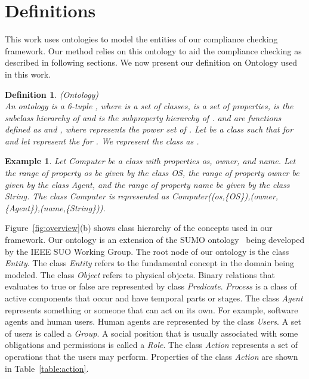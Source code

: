 \documentclass[12pt,journal,letterpaper,onecolumn]{IEEEtran}
\newtheorem{definition}{Definition}[section]
\newtheorem{example}{Example}[section]
\begin{document}
\section{Definitions}
\label{sec:definitions} This work uses ontologies to model the
entities of our compliance checking framework. Our method relies on this
ontology to aid the compliance checking as described in following
sections.  We now present our definition on Ontology used in
this work.



\begin{definition}(Ontology)\\
An ontology  is a 6-tuple
,
where  is a set of classes,  is a set of
properties,  is the subclass hierarchy of
 and  is the subproperty hierarchy of
.  and  are functions defined as
 and
, where
 represents the power set of .
Let  be a class such that  for
 and let  represent the  for
. We represent the class  as
. \label{def:ontology}
\end{definition}

\begin{example} Let {\ttfamily Computer} be a class with properties {\ttfamily os}, {\ttfamily owner},
and {\ttfamily name}. Let the range of property {\ttfamily os} be
given by the class {\ttfamily OS}, the range of property {\ttfamily
owner} be given by the class {\ttfamily Agent}, and the range of
property {\ttfamily name} be given by the class {\ttfamily String}.
The class {\ttfamily Computer} is represented as {\ttfamily
Computer((os,\{OS\}),(owner,\{Agent\}),(name,\{String\}))}.
\label{eg:class}
\end{example}

Figure~\ref{fig:overview}(b) shows class hierarchy of the concepts
used in our framework. Our ontology is an extension of the SUMO
ontology~\cite{sumo} being developed by the IEEE SUO Working Group.
The root node of our ontology is the class {\em Entity}. The class
{\em Entity} refers to the fundamental concept in the domain being
modeled. The class {\em Object} refers to physical objects. Binary
relations that evaluates to true or false are represented by class
{\em Predicate}. {\em Process} is a class of active components that
occur and have temporal parts or stages. The class {\em Agent}
represents something or someone that can act on its own. For
example, software agents and human users. Human agents are
represented by the class {\em Users}. A set of users is called a
{\em Group}. A social position that is usually associated with some
obligations and permissions is called a {\em Role}. The class {\em
Action} represents a set of operations that the users may perform.
Properties of the class {\em Action} are shown in
Table~\ref{table:action}.
\end{document}
